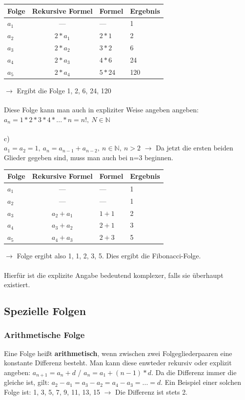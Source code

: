 \documentclass{article}
\newcommand{\N}{\mathbb{N}}
\begin{document}
	\begin{tabular}{| l | c | l | l |}
		\toprule
		Folge & Rekursive Formel & Formel & Ergebnis \\ \midrule
		$a_1$ & --- & --- & 1 \\
		$a_2$ & $2*a_{1}$ & $2*1$ & 2 \\
		$a_3$ & $2*a_{2}$ & $3*2$ & 6 \\
		$a_4$ & $2*a_{3}$ & $4*6$ & 24 \\
		$a_5$ & $2*a_{4}$ & $5*24$ & 120 \\
		\bottomrule
	\end{tabular}
	$\to$ Ergibt die Folge 1, 2, 6, 24, 120 \\ \\
	Diese Folge kann man auch in expliziter Weise angeben angeben: $a_n=1*2*3*4*...*n = n!,\ N\in\N$ \\ \\
	c) \\
	$a_1=a_2=1,\ a_n=a_{n-1}+a_{n-2},\ n\in\N,\ n>2$ $\to$ Da jetzt die ersten beiden Glieder gegeben sind, muss man auch bei n=3 beginnen. \\
	\begin{tabular}{| l | c | l | l |}
		\toprule
		Folge & Rekursive Formel & Formel & Ergebnis \\ \midrule
		$a_1$ & --- & --- & 1 \\
		$a_2$ & --- & --- & 1 \\
		$a_3$ & $a_2+a_1$ & $1+1$ & 2 \\
		$a_4$ & $a_3+a_2$ & $2+1$ & 3 \\
		$a_5$ & $a_4+a_3$ & $2+3$ & 5 \\
		\bottomrule
	\end{tabular}
	$\to$ Folge ergibt also 1, 1, 2, 3, 5. Dies ergibt die Fibonacci-Folge. \\ \\
	Hierfür ist die explizite Angabe bedeutend komplexer, falls sie überhaupt existiert.
	\subsection{Spezielle Folgen}
	\subsubsection{Arithmetische Folge}
	Eine Folge heißt \textbf{arithmetisch}, wenn zwischen zwei Folgegliederpaaren eine konstante Differenz besteht. Man kann diese enwteder rekursiv oder explizit angeben: $a_{n+1}=a_n+d$ / $a_n=a_1+(n - 1)*d$. Da die Differenz immer die gleiche ist, gilt: $a_2-a_1=a_3-a_2=a_4-a_3=...=d$. Ein Beispiel einer solchen Folge ist: 1, 3, 5, 7, 9, 11, 13, 15 $\to$ Die Differenz ist stets 2.
\end{document}
